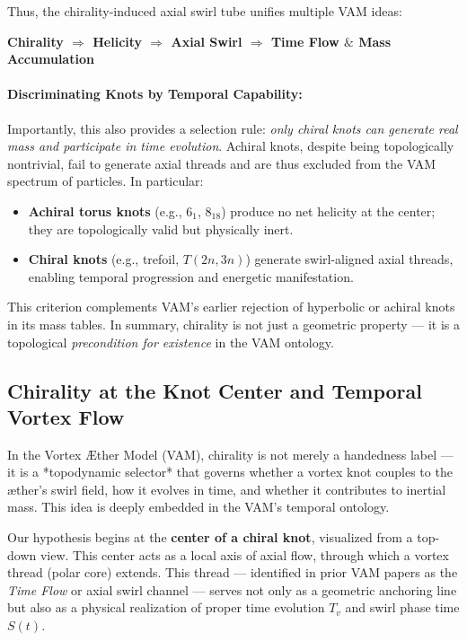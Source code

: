 Thus, the chirality-induced axial swirl tube unifies multiple VAM ideas:
\vspace{0.5em}
\begin{center}
\textbf{Chirality $\Rightarrow$ Helicity $\Rightarrow$ Axial Swirl $\Rightarrow$ Time Flow $\&$ Mass Accumulation}
\end{center}

\paragraph{Discriminating Knots by Temporal Capability:}
Importantly, this also provides a selection rule: \emph{only chiral knots can generate real mass and participate in time evolution}. Achiral knots, despite being topologically nontrivial, fail to generate axial threads and are thus excluded from the VAM spectrum of particles. In particular:
\begin{itemize}
    \item \textbf{Achiral torus knots} (e.g., $6_1$, $8_{18}$) produce no net helicity at the center; they are topologically valid but physically inert.
    \item \textbf{Chiral knots} (e.g., trefoil, $T(2n,3n)$) generate swirl-aligned axial threads, enabling temporal progression and energetic manifestation.
\end{itemize}

This criterion complements VAM’s earlier rejection of hyperbolic or achiral knots in its mass tables. In summary, chirality is not just a geometric property --- it is a topological \textit{precondition for existence} in the VAM ontology.

\subsection{Chirality at the Knot Center and Temporal Vortex Flow}

In the Vortex Æther Model (VAM), chirality is not merely a handedness label — it is a *topodynamic selector* that governs whether a vortex knot couples to the æther's swirl field, how it evolves in time, and whether it contributes to inertial mass. This idea is deeply embedded in the VAM's temporal ontology.

Our hypothesis begins at the \textbf{center of a chiral knot}, visualized from a top-down view. This center acts as a local axis of axial flow, through which a vortex thread (polar core) extends. This thread — identified in prior VAM papers as the \textit{Time Flow} or axial swirl channel — serves not only as a geometric anchoring line but also as a physical realization of proper time evolution $T_v$ and swirl phase time $S(t)$.

